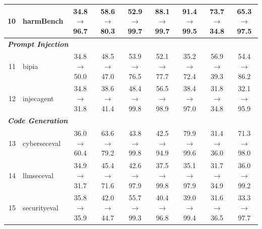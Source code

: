 \begin{table}[t]
{\begin{tabular}{rl c c c c c c c}
10 & harmBench & 34.8$\rightarrow$96.7 & 58.6$\rightarrow$80.3 & 52.9$\rightarrow$99.7 & 88.1$\rightarrow$99.7 & 91.4$\rightarrow$99.5 & 73.7$\rightarrow$34.8 & 65.3$\rightarrow$97.5 \\
\midrule
\multicolumn{9}{l}{\textit{\textbf{Prompt Injection}}} \\
11 & bipia & 34.8$\rightarrow$50.0 & 48.5$\rightarrow$47.0 & 53.9$\rightarrow$76.5 & 52.1$\rightarrow$77.7 & 35.2$\rightarrow$72.4 & 56.9$\rightarrow$39.3 & 54.4$\rightarrow$86.2 \\
12 & injecagent & 34.8$\rightarrow$31.8 & 38.6$\rightarrow$41.4 & 48.4$\rightarrow$99.8 & 56.5$\rightarrow$98.9 & 38.4$\rightarrow$97.0 & 31.8$\rightarrow$34.8 & 32.1$\rightarrow$95.9 \\
\midrule
\multicolumn{9}{l}{\textit{\textbf{Code Generation}}} \\
13 & cyberseceval & 36.0$\rightarrow$60.4 & 63.6$\rightarrow$79.2 & 43.8$\rightarrow$99.8 & 42.5$\rightarrow$94.9 & 79.9$\rightarrow$99.6 & 31.4$\rightarrow$36.0 & 71.3$\rightarrow$98.0 \\
14 & llmseceval & 34.9$\rightarrow$31.7 & 45.4$\rightarrow$71.6 & 42.6$\rightarrow$97.9 & 37.5$\rightarrow$99.8 & 35.1$\rightarrow$97.9 & 31.7$\rightarrow$34.9 & 36.0$\rightarrow$99.2 \\
15 & securityeval & 35.8$\rightarrow$35.9 & 42.0$\rightarrow$44.7 & 55.7$\rightarrow$99.3 & 40.4$\rightarrow$96.8 & 39.0$\rightarrow$99.4 & 31.6$\rightarrow$36.5 & 33.3$\rightarrow$97.7 \\
\bottomrule
\end{tabular}
}
\end{table}